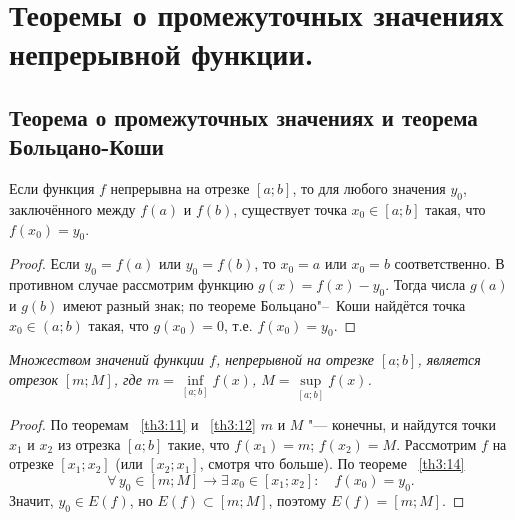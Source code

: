 \chapter{Теоремы о промежуточных значениях непрерывной функции.}
\section{Теорема о промежуточных значениях и теорема Больцано-Коши}


\begin{thm} \label{th3:14}
Если функция $f$ непрерывна на отрезке $[a; b]$, то для любого значения $y_0$, заключённого между $f(a)$ и $f(b)$, существует точка $x_0 \in [a; b]$ такая, что $f(x_0) = y_0$.
\end{thm}

\begin{proof}
Если $y_0 = f(a)$ или $y_0 = f(b)$, то $x_0 = a$ или $x_0 = b$ соответственно. В противном случае рассмотрим функцию $g(x) = f(x) - y_0$. Тогда числа $g(a)$ и $g(b)$ имеют разный знак; по теореме Больцано"--~Коши найдётся точка $x_0 \in (a; b)$ такая, что $g(x_0) = 0$, т.е. $f(x_0) = y_0$.
\end{proof}

\begin{cons}
    \textit{Множеством значений функции $f$, непрерывной на отрезке $[a; b]$, является отрезок $[m; M]$, где $m = \inf\limits_{[a; b]} f(x)$, $M = \sup\limits_{[a; b]} f(x)$.}
\end{cons} 

\begin{proof}
По теоремам ~\ref{th3:11} и ~\ref{th3:12} $m$ и $M$ "--- конечны, и найдутся точки $x_1$ и $x_2$ из отрезка $[a; b]$ такие, что $f(x_1) = m$; $f(x_2) = M$. Рассмотрим $f$ на отрезке $[x_1; x_2]$ (или $[x_2; x_1]$, смотря что больше). По теореме ~\ref{th3:14}
$$
\forall\, y_0 \in [m; M] \to \exists\, x_0 \in [x_1; x_2] \colon \quad f(x_0) = y_0.
$$
Значит, $y_0 \in E(f)$, но $E(f) \subset [m; M]$, поэтому $E(f) = [m; M]$.
\end{proof}


